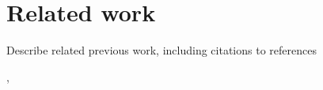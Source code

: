 \section{Related work}
\label{sec:related}
Describe related previous work, including citations to references

\cite{qres_ama}, \cite{DBLP:journals/pieee/AbbasAMMR18}